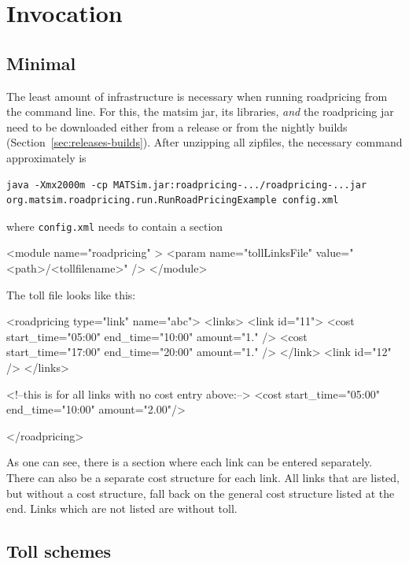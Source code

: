 \section{Invocation}

\subsection{Minimal}

The least amount of infrastructure is necessary when running roadpricing from the command line.  For this, the \acrshort{matsim} jar, its libraries, \emph{and} the roadpricing jar need to be downloaded either from a release or from the nightly builds (Section~\ref{sec:releases-builds}).  After unzipping all zipfiles, the necessary command approximately is
\begin{lstlisting}
java -Xmx2000m -cp MATSim.jar:roadpricing-.../roadpricing-...jar org.matsim.roadpricing.run.RunRoadPricingExample config.xml  
\end{lstlisting}
where \lstinline$config.xml$ needs to contain a section
\begin{xml}
	<module name="roadpricing" >
		<param name="tollLinksFile" value="<path>/<tollfilename>" />
	</module>
\end{xml}
The toll file looks like this:
\begin{xml}
<roadpricing type="link" name="abc">
   <links>
      <link id="11">
         <cost start_time="05:00" end_time="10:00" amount="1." />
         <cost start_time="17:00" end_time="20:00" amount="1." />
      </link>             
      <link id="12" />
   </links>

   <!--this is for all links with no cost entry above:-->
   <cost start_time="05:00" end_time="10:00" amount="2.00"/>

</roadpricing>
\end{xml}
As one can see, there is a section where each link can be entered separately.  There can also be a separate cost structure for each link.  All links that are listed, but without a cost structure, fall back on the general cost structure listed at the end.  Links which are not listed are without toll.

\subsection{Toll schemes}

